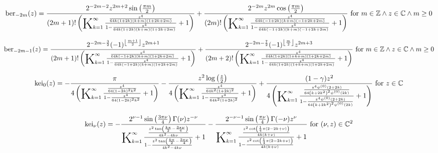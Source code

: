 \documentclass{article}
\newcommand{\bigK}{\mathop{\raisebox{-5pt}{\huge K}}}
\begin{document}
\[\text{ber}_{-2 m}(z)=\frac{2^{-2 m-2} z^{2 m+2} \sin \left(\frac{\pi  m}{2}\right)}{(2 m+1)! \left(\bigK_{k=1}^{\infty}\frac{\frac{z^4}{64 k (1+2 k) (k+m) (1+2 k+2 m)}}{1-\frac{z^4}{64 k (1+2 k) (k+m) (1+2 k+2 m)}}+1\right)}+\frac{2^{-2 m} z^{2 m} \cos \left(\frac{\pi  m}{2}\right)}{(2 m)! \left(\bigK_{k=1}^{\infty}\frac{\frac{z^4}{64 k (-1+2 k) (k+m) (-1+2 k+2 m)}}{1-\frac{z^4}{64 k (-1+2 k) (k+m) (-1+2 k+2 m)}}+1\right)}\text{ for }m\in \mathbb{Z}\land z\in \mathbb{C}\land m\geq 0\] 

\[\text{ber}_{-2 m-1}(z)=\frac{2^{-2 m-\frac{3}{2}} (-1)^{\left\lfloor \frac{m+1}{2}\right\rfloor } z^{2 m+1}}{(2 m+1)! \left(\bigK_{k=1}^{\infty}\frac{\frac{z^4}{64 k (-1+2 k) (k+m) (1+2 k+2 m)}}{1-\frac{z^4}{64 k (-1+2 k) (k+m) (1+2 k+2 m)}}+1\right)}+\frac{2^{-2 m-\frac{7}{2}} (-1)^{\left\lfloor \frac{m}{2}\right\rfloor } z^{2 m+3}}{(2 m+2)! \left(\bigK_{k=1}^{\infty}\frac{\frac{z^4}{64 k (1+2 k) (1+k+m) (1+2 k+2 m)}}{1-\frac{z^4}{64 k (1+2 k) (1+k+m) (1+2 k+2 m)}}+1\right)}\text{ for }m\in \mathbb{Z}\land z\in \mathbb{C}\land m\geq 0\] 

\[\text{kei}_0(z)=-\frac{\pi }{4 \left(\bigK_{k=1}^{\infty}\frac{\frac{z^4}{64 (1-2 k)^2 k^2}}{1-\frac{z^4}{64 (1-2 k)^2 k^2}}+1\right)}-\frac{z^2 \log \left(\frac{z}{2}\right)}{4 \left(\bigK_{k=1}^{\infty}\frac{\frac{z^4}{64 k^2 (1+2 k)^2}}{1-\frac{z^4}{64 k^2 (1+2 k)^2}}+1\right)}+\frac{(1-\gamma ) z^2}{4 \left(\bigK_{k=1}^{\infty}\frac{\frac{z^4 \psi ^{(0)}(2+2 k)}{64 \left(k+2 k^2\right)^2 \psi ^{(0)}(2 k)}}{1-\frac{z^4 \psi ^{(0)}(2+2 k)}{64 \left(k+2 k^2\right)^2 \psi ^{(0)}(2 k)}}+1\right)}\text{ for }z\in \mathbb{C}\] 

\[\text{kei}_{\nu }(z)=-\frac{2^{\nu -1} \sin \left(\frac{3 \pi  \nu }{4}\right) \Gamma (\nu ) z^{-\nu }}{\bigK_{k=1}^{\infty}\frac{\frac{z^2 \tan \left(\frac{k \pi }{2}-\frac{3 \pi  \nu }{4}\right)}{4 k^2-4 k \nu }}{1-\frac{z^2 \tan \left(\frac{k \pi }{2}-\frac{3 \pi  \nu }{4}\right)}{4 k^2-4 k \nu }}+1}-\frac{2^{-\nu -1} \sin \left(\frac{\pi  \nu }{4}\right) \Gamma (-\nu ) z^{\nu }}{\bigK_{k=1}^{\infty}\frac{\frac{z^2 \cot \left(\frac{1}{4} \pi  (2-2 k+\nu )\right)}{4 k (k+\nu )}}{1-\frac{z^2 \cot \left(\frac{1}{4} \pi  (2-2 k+\nu )\right)}{4 k (k+\nu )}}+1}\text{ for }(\nu ,z)\in \mathbb{C}^2\] 
\end{document}
